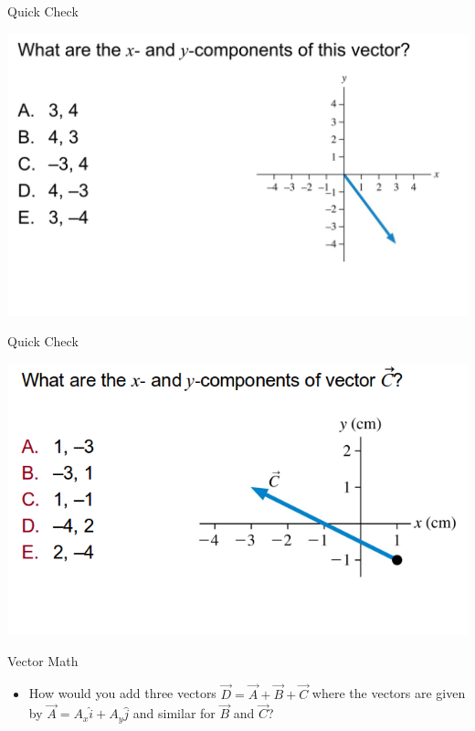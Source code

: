 \documentclass{beamer}
\newcommand{\red}[1]{{\color{red}{#1}}}
\newcommand{\checkL}[2]{\begin{textblock*}{1cm}(#1,#2){\Large \red{\Checkmark}}\end{textblock*}}
\begin{document}
\begin{frame}{Quick Check}
\begin{center}
   \includegraphics[width=\textwidth]{../figures/QC3_4.png}
\end{center}
\only<2->{\checkL{0.9cm}{5.4cm}}
\end{frame}

\begin{frame}{Quick Check}
\begin{center}
   \includegraphics[width=\textwidth]{../figures/QC3_5.png}
\end{center}
\only<2->{\checkL{1.0cm}{5.0cm}}
\end{frame}

\begin{frame}{Vector Math}
\begin{itemize}
   \item How would you add three vectors $\vec{D}=\vec{A}+\vec{B}+\vec{C}$ where the vectors are given by $\vec{A} = A_x\hat{i} + A_y\hat{j}$ and similar for $\vec{B}$ and $\vec{C}$?
\end{itemize}
\end{frame}
\end{document}
